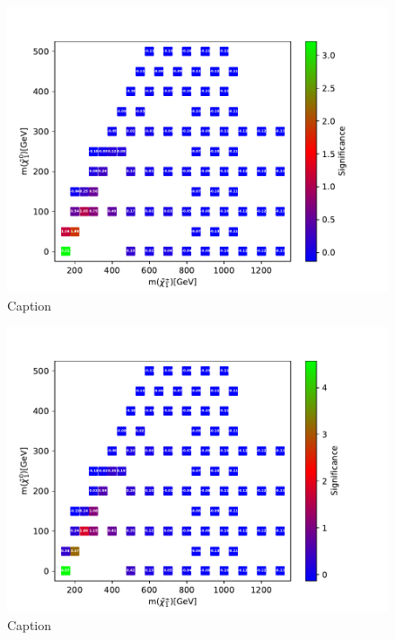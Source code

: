 \begin{figure}
    \centering
    \includegraphics[width = \textwidth]{Figures/Significances/significance_NN_slepsnu_Low_level.pdf}
    \caption{Caption}
    \label{fig:my_label}
\end{figure}


\begin{figure}
    \centering
    \includegraphics[width = \textwidth]{Figures/Significances/significance_NN_slepsnu_High_level.pdf}
    \caption{Caption}
    \label{fig:my_label}
\end{figure}

























